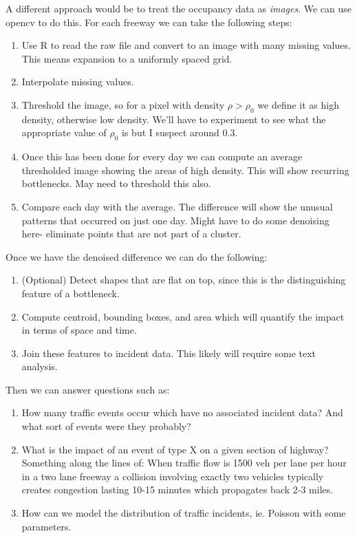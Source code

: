 \documentclass[12pt]{article}
\begin{document}
A different approach would be to treat the occupancy data as \emph{images}.
We can use opencv to do this. For each freeway we can take the following
steps:
\begin{enumerate}
    \item Use R to read the raw file and convert to an image with many missing
        values. This means expansion to a uniformly spaced grid.
    \item Interpolate missing values. 
    \item Threshold the image, so for a pixel with density $\rho >
        \rho_0$
        we define it as high density, otherwise low density. We'll
        have to experiment to see what the appropriate value of $\rho_0$ is
        but I suspect around 0.3.
    \item Once this has been done for every day we can compute an average
        thresholded image showing the areas of high density. This will show
        recurring bottlenecks. May need to threshold this also.
    \item Compare each day with the average. The difference will show the
        unusual patterns that occurred on just one day. Might have to do
        some denoising here- eliminate points that are not part of a 
        cluster.
\end{enumerate}

Once we have the denoised difference we can do the following:
\begin{enumerate}
    \item (Optional) Detect shapes that are flat on top, since this is the
        distinguishing feature of a bottleneck.
    \item Compute centroid, bounding boxes, and area which will quantify the impact
        in terms of space and time.
    \item Join these features to incident data. This likely will require some text
        analysis.
\end{enumerate}

Then we can answer questions such as:
\begin{enumerate}
    \item How many traffic events occur which have no associated incident
        data? And what sort of events were they probably?
    \item What is the impact of an event of type X on a given section of
        highway? Something along the lines of: When traffic flow is 1500
        veh per lane per hour in a two lane freeway a collision involving
        exactly two vehicles typically creates congestion lasting 10-15
        minutes which propagates back 2-3 miles. 
    \item How can we model the distribution of traffic incidents, ie.
        Poisson with some parameters.
\end{enumerate}
\end{document}
